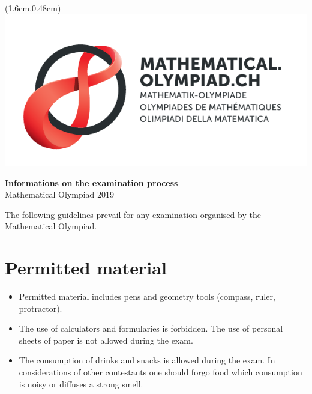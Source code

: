 \documentclass[12pt,a4paper]{article}
\begin{document}
\thispagestyle{empty}

\begin{textblock*}{\paperwidth}(1.6cm,0.48cm) %
\includegraphics[scale=0.67]{Logo_Mathematik_CMYK.pdf}
\end{textblock*}

\vspace*{1.5cm}

\begin{center}
\Huge{\textbf{Informations on the examination process}}\\
\large{Mathematical Olympiad 2019}
\end{center}

\bigskip

The following guidelines prevail for any examination organised by the Mathematical Olympiad.

\section{Permitted material}
\begin{itemize}
\item Permitted material includes pens and geometry tools (compass, ruler, protractor).
\item The use of calculators and formularies is forbidden. The use of personal sheets of paper is not allowed during the exam.
\item The consumption of drinks and snacks is allowed during the exam. In considerations of other contestants one should forgo food which consumption is noisy or diffuses a strong smell.
\end{itemize}
\end{document}
